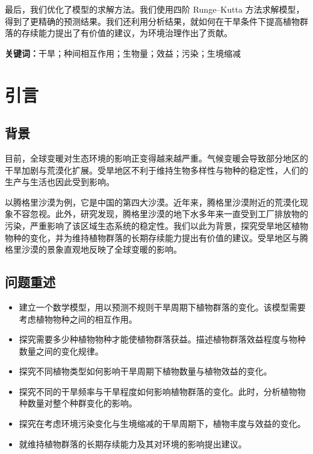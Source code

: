 \documentclass[11pt,a4paper]{ctexart}
\begin{document}
最后，我们优化了模型的求解方法。我们使用四阶 Runge--Kutta 方法求解模型，得到了更精确的预测结果。我们还利用分析结果，就如何在干旱条件下提高植物群落的存续能力提出了有价值的建议，为环境治理作出了贡献。

\vspace{6pt}
\noindent\textbf{关键词：}干旱；种间相互作用；生物量；效益；污染；生境缩减

\newpage
\pagestyle{fancy}

\section{引言}

\subsection{背景}

目前，全球变暖对生态环境的影响正变得越来越严重。气候变暖会导致部分地区的干旱加剧与荒漠化扩展。受旱地区不利于维持生物多样性与物种的稳定性，人们的生产与生活也因此受到影响。

以腾格里沙漠为例，它是中国的第四大沙漠。近年来，腾格里沙漠附近的荒漠化现象不容忽视。此外，研究发现，腾格里沙漠的地下水多年来一直受到工厂排放物的污染，严重影响了该区域生态系统的稳定性。我们以此为背景，探究受旱地区植物物种的变化，并为维持植物群落的长期存续能力提出有价值的建议。受旱地区与腾格里沙漠的景象直观地反映了全球变暖的影响。

\subsection{问题重述}

\begin{itemize}
\item 建立一个数学模型，用以预测不规则干旱周期下植物群落的变化。该模型需要考虑植物物种之间的相互作用。
\item 探究需要多少种植物物种才能使植物群落获益。描述植物群落效益程度与物种数量之间的变化规律。
\item 探究不同植物类型如何影响干旱周期下植物数量与植物效益的变化。
\item 探究不同的干旱频率与干旱程度如何影响植物群落的变化。此时，分析植物物种数量对整个种群变化的影响。
\item 探究在考虑环境污染变化与生境缩减的干旱周期下，植物丰度与效益的变化。
\item 就维持植物群落的长期存续能力及其对环境的影响提出建议。
\end{itemize}
\end{document}
